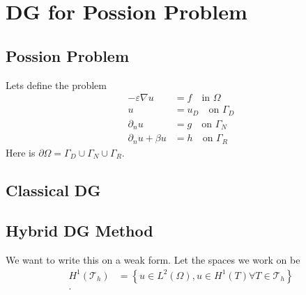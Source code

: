 



\section{DG for Possion Problem}%
\subsection{Possion Problem}%
\label{sub:possion_problem}

Lets define the problem \[
\begin{split}
    -\varepsilon \nabla u &= f \quad \text{in } \Omega   \\
    u&= u_{D} \quad \text{on } \Gamma _{D} \\
    \partial _{n} u & = g \quad \text{on } \Gamma _{N} \\
    \partial _{n} u +  \beta u & = h \quad \text{on } \Gamma _{R}
\end{split}
\]
Here is $\partial \Omega  = \Gamma _{D} \cup \Gamma _{N} \cup \Gamma _{R}$.

\subsection{Classical DG}%
\label{sub:classical_dg}





\subsection{Hybrid DG Method} %
\label{sec:hybrid_dg_method}

 We want to write this on a weak form. Let
the spaces we work on be \[
    \begin{split}
H^{1}\left( \mathcal{T}_{h}  \right) & = \left\{ u \in L^2\left( \Omega  \right), u \in H^{1 } \left( T \right) \forall T
\in  \mathcal{T} _{h }\right\} \\.
    \end{split}
\]

